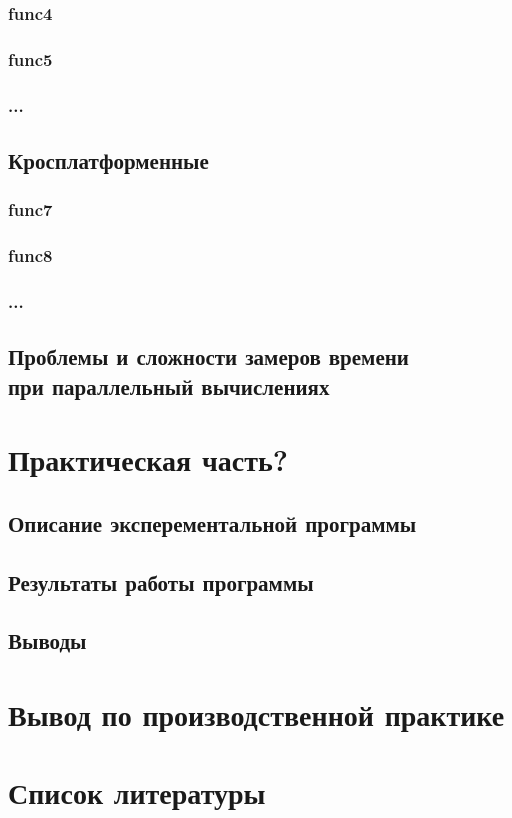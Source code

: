 \documentclass{article}
\begin{document}
			\subsubsection{func4}
			\subsubsection{func5}
			\subsubsection{...}
		\subsection{Кросплатформенные}
			\subsubsection{func7}
			\subsubsection{func8}
			\subsubsection{...}
		\subsection{Проблемы и сложности замеров времени \\ при параллельный вычислениях}
	\newpage
	\section{Практическая часть?}
		\subsection{Описание эксперементальной программы}
		\subsection{Результаты работы программы}
		\subsection{Выводы}
	\newpage
	\section{Вывод по производственной практике}
	\newpage
	\section{Список литературы}
\end{document}
